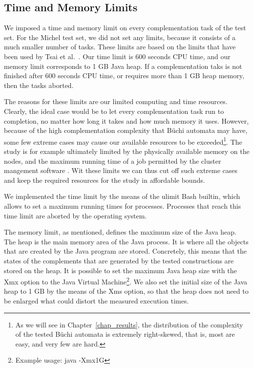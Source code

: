 
\subsection{Time and Memory Limits}
\label{4_limits}
We imposed a time and memory limit on every complementation task of the \goal{} test set. For the Michel test set, we did not set any limits, because it consists of a much smaller number of tasks. These limits are based on the limits that have been used by Tsai et al.~\cite{2011_tsai}. Our time limit is 600 seconds CPU time, and our memory limit corresponds to 1 GB Java heap. If a complementation taks is not finished after 600 seconds CPU time, or requires more than 1 GB heap memory, then the tasks aborted.

The reasons for these limits are our limited computing and time resources. Clearly, the ideal case would be to let every complementation task run to completion, no matter how long it takes and how much memory it uses. However, because of the high complementation complexity that Büchi automata may have, some few extreme cases may cause our available resources to be exceeded\footnote{As we will see in Chapter~\ref{chap_results}, the distribution of the complexity of the tested Büchi automata is extremely right-skewed, that is, most are easy, and very few are hard.}. The study is for example ultimately limited by the physically available memory on the nodes, and the maximum running time of a job permitted by the cluster mangement software . Wit these limits we can thus cut off such extreme cases and keep the required resources for the study in affordable bounds.

We implemented the time limit by the means of the \textsf{ulimit} Bash builtin, which allows to set a maximum running times for processes. Processes that reach this time limit are aborted by the operating system.

The memory limit, as mentioned, defines the maximum size of the Java heap. The heap is the main memory area of the Java process. It is where all the objects that are created by the Java program are stored. Concretely, this means that the states of the complements that are generated by the tested constructions are stored on the heap. It is possible to set the maximum Java heap size with the \textsf{Xmx} option to the Java Virtual Machine\footnote{Example usage: \textsf{java -Xmx1G}}. We also set the initial size of the Java heap to 1 GB by the means of the \textsf{Xms} option, so that the heap does not need to be enlarged what could distort the measured execution times.

